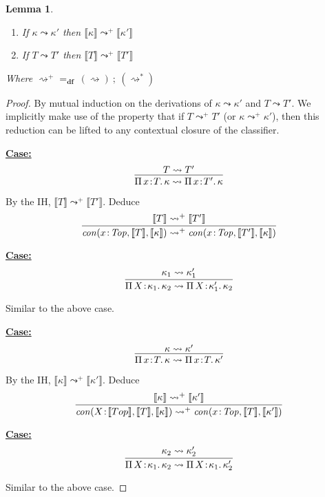 \documentclass{article}
\newcommand{\abs}[4]{{#1}\, #2\! : \! #3.\, #4}
\newcommand{\interp}[1]{\llbracket #1 \rrbracket}
\newcommand{\startcase}[1]{\vspace{#1} \noindent\textbf{\underline{Case:}}}
\newtheorem{lemma}[theorem]{Lemma}
\begin{document}
\begin{lemma}
  \label{thm:stlc-dynamic-sound}
  \
  \begin{enumerate}
  \item If \(\kappa \leadsto \kappa'\) then \(\interp{\kappa} \leadsto^+
    \interp{\kappa'}\)
    
  \item If \(T \leadsto T'\) then \(\interp{T} \leadsto^+ \interp{T'}\)
  \end{enumerate}

  Where \(\rightsquigarrow^+ =_{\textbf{df}}\ (\rightsquigarrow)\ ;\ (\rightsquigarrow^*)\)
\end{lemma}
\begin{proof}
  By mutual induction on the derivations of \(\kappa \leadsto \kappa'\) and \(T
  \leadsto T'\).
  We implicitly make use of the property that if \(T \leadsto^+ T'\) (or
  \(\kappa \leadsto^+ \kappa'\)), then this reduction can be lifted to any
  contextual closure of the classifier.

  \startcase{.2cm}
  \[
    \infer{
      \abs{\Pi}{x}{T}{\kappa} \leadsto \abs{\Pi}{x}{T'}{\kappa}
    }{
      T \leadsto T'
    }
  \]

  By the IH, \(\interp{T} \leadsto^+ \interp{T'}\).
  Deduce
  \[
    \infer{
      \mathit{con}(x\!:\!\mathit{Top},\interp{T},\interp{\kappa})
      \leadsto^+ \mathit{con}(x\!:\!\mathit{Top},\interp{T'},\interp{\kappa})
    }{
      \interp{T} \leadsto^+ \interp{T'}
    }
  \]

  \startcase{.2cm}
  \[
    \infer{
      \abs{\Pi}{X}{\kappa_1}{\kappa_2} \leadsto \abs{\Pi}{X}{\kappa_1'}{\kappa_2}
    }{
      \kappa_1 \leadsto \kappa_1'
    }
  \]

  Similar to the above case.

  \startcase{.2cm}
  \[
    \infer{
      \abs{\Pi}{x}{T}{\kappa} \leadsto \abs{\Pi}{x}{T}{\kappa'}
    }{
      \kappa \leadsto \kappa'
    }
  \]

  By the IH, \(\interp{\kappa} \leadsto^+ \interp{\kappa'}\).
  Deduce
  \[
    \infer{
      \mathit{con}(X\!:\!\interp{Top},\interp{T},\interp{\kappa})
      \leadsto^+ \mathit{con}(x\!:\!\mathit{Top},\interp{T},\interp{\kappa'})
    }{
      \interp{\kappa} \leadsto^+ \interp{\kappa'}
    }
  \]

  \startcase{.2cm}
  \[
    \infer{
      \abs{\Pi}{X}{\kappa_1}{\kappa_2} \leadsto \abs{\Pi}{X}{\kappa_1}{\kappa_2'}
    }{
      \kappa_2 \leadsto \kappa_2'
    }
  \]

  Similar to the above case.


\end{proof}
\end{document}
